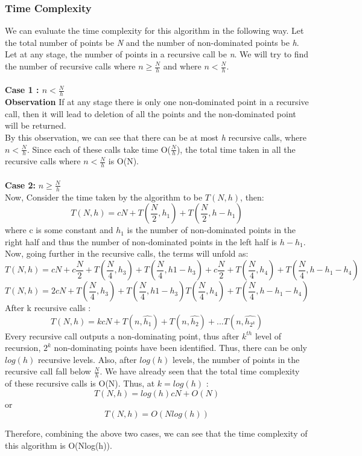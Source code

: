 \documentclass{article}
\begin{document}
\subsubsection{Time Complexity}
We can evaluate the time complexity for this algorithm in the following way. Let the total number of points be \emph{N} and the number of non-dominated points be \emph{h}. Let at any stage, the number of points in a recursive call be \emph{n}. We will try to find the number of recursive calls where $n \geq \frac{N}{h}$ and where $n < \frac{N}{h}$. \\ \\
\textbf{ Case 1 : $n < \frac{N}{h}$} \\
\textbf{Observation} If at any stage there is only one non-dominated point in a recursive call, then it will lead to deletion of all the points and the non-dominated point will be returned. \\
By this observation, we can see that there can be at most \emph{h} recursive calls, where $n < \frac{N}{h}$. Since each of these calls take time O($\frac{N}{h}$), the total time taken in all the recursive calls where $n < \frac{N}{h}$ is O(N).\\ \\
\textbf{Case 2:} $n \geq \frac{N}{h}$ \\
Now, Consider the time taken by the algorithm to be $T(N,h)$, then:
$$T(N,h) = cN + T (\frac{N}{2},h_1) + T(\frac{N}{2},h-h_1)$$
where c is some constant and $h_1$ is the number of non-dominated points in the right half and thus the number of non-dominated points in the left half is $h-h_1$. Now, going further in the recursive calls, the terms will unfold as:
$$T(N,h) = cN + c\frac{N}{2} + T (\frac{N}{4},h_3) + T(\frac{N}{4},h1-h_3) + c\frac{N}{2} + T (\frac{N}{4},h_4) + T(\frac{N}{4},h-h_1-h_4)$$
$$T(N,h) = 2cN + T (\frac{N}{4},h_3) + T(\frac{N}{4},h1-h_3) T (\frac{N}{4},h_4) + T(\frac{N}{4},h-h_1-h_4)$$
After k recursive calls :
$$T(N,h) = kcN + T (n,\hat{h_1}) + T(n,\hat{h_2})+ ...T(n,\hat{h_{2^k}})$$
Every recursive call outputs a non-dominating point, thus after $k^{th}$ level of recursion, $2^k$ non-dominating points have been identified. Thus, there can be only $log(h)$ recursive levels. Also, after $log(h)$ levels, the number of points in the recursive call fall below $\frac{N}{h}$. We have already seen that the total time complexity of these recursive calls is O(N). Thus, at $k=log(h)$ :
$$T(N,h) = log(h)cN + O(N) $$
or $$T(N,h) = O(Nlog(h)) $$ 

Therefore, combining the above two cases, we can see that the time complexity of this algorithm is O(Nlog(h)).
\end{document}
